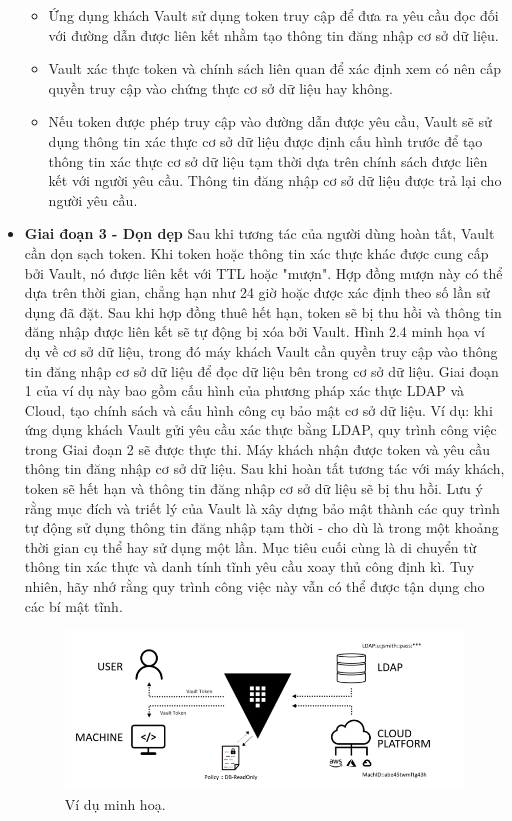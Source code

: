 \documentclass[12pt,a4paper]{report}
\begin{document}
\begin{itemize}
\begin{itemize}
			\item {Ứng dụng khách Vault sử dụng token truy cập để đưa ra yêu cầu đọc đối với đường dẫn được liên kết nhằm tạo thông tin đăng nhập cơ sở dữ liệu.}
			\item {Vault xác thực token và chính sách liên quan để xác định xem có nên cấp quyền truy cập vào chứng thực cơ sở dữ liệu hay không.}
			\item {Nếu token được phép truy cập vào đường dẫn được yêu cầu, Vault sẽ sử dụng thông tin xác thực cơ sở dữ liệu được định cấu hình trước để tạo thông tin xác thực cơ sở dữ liệu tạm thời dựa trên chính sách được liên kết với người yêu cầu. Thông tin đăng nhập cơ sở dữ liệu được trả lại cho người yêu cầu.}
		\end{itemize}
		\item \textbf{Giai đoạn 3 - Dọn dẹp}
		\smallskip
		\subitem Sau khi tương tác của người dùng hoàn tất, Vault cần dọn sạch token. Khi token hoặc thông tin xác thực khác được cung cấp bởi Vault, nó được liên kết với TTL hoặc "mượn". Hợp đồng mượn này có thể dựa trên thời gian, chẳng hạn như 24 giờ hoặc được xác định theo số lần sử dụng đã đặt. Sau khi hợp đồng thuê hết hạn, token sẽ bị thu hồi và thông tin đăng nhập được liên kết sẽ tự động bị xóa bởi Vault.
		\subitem Hình 2.4 minh họa ví dụ về cơ sở dữ liệu, trong đó máy khách Vault cần quyền truy cập vào thông tin đăng nhập cơ sở dữ liệu để đọc dữ liệu bên trong cơ sở dữ liệu. Giai đoạn 1 của ví dụ này bao gồm cấu hình của phương pháp xác thực LDAP và Cloud, tạo chính sách và cấu hình công cụ bảo mật cơ sở dữ liệu. Ví dụ: khi ứng dụng khách Vault gửi yêu cầu xác thực bằng LDAP, quy trình công việc trong Giai đoạn 2 sẽ được thực thi. Máy khách nhận được token và yêu cầu thông tin đăng nhập cơ sở dữ liệu. Sau khi hoàn tất tương tác với máy khách, token sẽ hết hạn và thông tin đăng nhập cơ sở dữ liệu sẽ bị thu hồi.
		\subitem Lưu ý rằng mục đích và triết lý của Vault là xây dựng bảo mật thành các quy trình tự động sử dụng thông tin đăng nhập tạm thời - cho dù là trong một khoảng thời gian cụ thể hay sử dụng một lần. Mục tiêu cuối cùng là di chuyển từ thông tin xác thực và danh tính tĩnh yêu cầu xoay thủ công định kì. Tuy nhiên, hãy nhớ rằng quy trình công việc này vẫn có thể được tận dụng cho các bí mật tĩnh.
		\begin{figure}[h]
			\centering
			\includegraphics[width=1\textwidth]{"Pics/clean_up"}
			\caption{\label{fig:clean_up} Ví dụ minh hoạ.}
			\label{fig:clean_up}
		\end{figure}
	\end{itemize}
\end{document}
